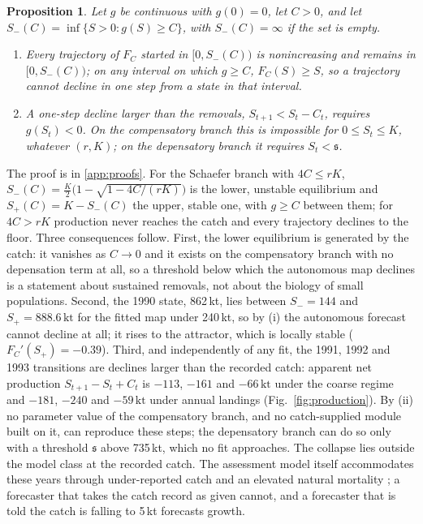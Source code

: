 \documentclass[preprint,11pt,authoryear]{elsarticle}
\newtheorem{proposition}{Proposition}
\theoremstyle{definition}
\theoremstyle{remark}
\newcommand{\kt}{\,\mathrm{kt}}
\newcommand{\sA}{\mathfrak{s}}
\begin{document}
\begin{proposition}\label{prop:repeller}
Let $g$ be continuous with $g(0)=0$, let $C>0$, and let $S_-(C) = \inf\{S>0 : g(S)\ge C\}$, with $S_-(C)=\infty$ if the set is empty.
\begin{enumerate}[label=(\roman*),leftmargin=2.2em,itemsep=1pt]
\item Every trajectory of $F_C$ started in $[0,S_-(C))$ is nonincreasing and remains in $[0,S_-(C))$; on any interval on which $g \ge C$, $F_C(S)\ge S$, so a trajectory cannot decline in one step from a state in that interval.
\item A one-step decline larger than the removals, $S_{t+1} < S_t - C_t$, requires $g(S_t) < 0$. On the compensatory branch this is impossible for $0\le S_t\le K$, whatever $(r,K)$; on the depensatory branch it requires $S_t < \sA$.
\end{enumerate}
\end{proposition}

The proof is in \ref{app:proofs}. For the Schaefer branch with $4C\le rK$, $S_-(C) = \tfrac{K}{2}\bigl(1-\sqrt{1-4C/(rK)}\bigr)$ is the lower, unstable equilibrium and $S_+(C)=K-S_-(C)$ the upper, stable one, with $g\ge C$ between them; for $4C>rK$ production never reaches the catch and every trajectory declines to the floor. Three consequences follow. First, the lower equilibrium is generated by the catch: it vanishes as $C\to 0$ and it exists on the compensatory branch with no depensation term at all, so a threshold below which the autonomous map declines is a statement about sustained removals, not about the biology of small populations. Second, the 1990 state, 862\,kt, lies between $S_-=144$ and $S_+=888.6\kt$ for the fitted map under 240\,kt, so by (i) the autonomous forecast cannot decline at all; it rises to the attractor, which is locally stable ($F_C'(S_+)=-0.39$). Third, and independently of any fit, the 1991, 1992 and 1993 transitions are declines larger than the recorded catch: apparent net production $S_{t+1}-S_t+C_t$ is $-113$, $-161$ and $-66\kt$ under the coarse regime and $-181$, $-240$ and $-59\kt$ under annual landings (Fig.~\ref{fig:production}). By (ii) no parameter value of the compensatory branch, and no catch-supplied module built on it, can reproduce these steps; the depensatory branch can do so only with a threshold $\sA$ above 735\,kt, which no fit approaches. The collapse lies outside the model class at the recorded catch. The assessment model itself accommodates these years through under-reported catch and an elevated natural mortality \citep{Cadigan2016}; a forecaster that takes the catch record as given cannot, and a forecaster that is told the catch is falling to 5\,kt forecasts growth.
\end{document}

